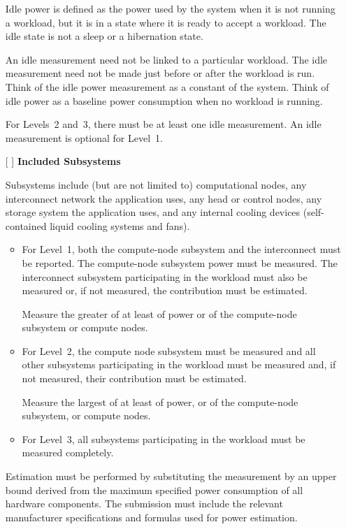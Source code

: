 \begin{itemize}
Idle power is defined as the power used by the system when it is not running a workload, but it is in a state where it is ready to accept a workload.
The idle state is not a sleep or a hibernation state.

An idle measurement need not be linked to a particular workload.
The idle measurement need not be made just before or after the workload is run.
Think of the idle power measurement as a constant of the system.
Think of idle power as a baseline power consumption when no workload is running.

For Levels~2 and~3, there must be at least one idle measurement.
An idle measurement is optional for Level~1.

\newpage
\item[{[ ]}]
\textbf{Included Subsystems}

Subsystems include (but are not limited to) computational nodes, any interconnect network the application uses, any head or control nodes, any storage system the application uses, and any internal cooling devices (self-contained liquid cooling systems and fans).

\begin{itemize}
\item
For Level~1, both the compute-node subsystem and the interconnect must be reported.
The compute-node subsystem power must be measured.
The interconnect subsystem participating in the workload must also be measured or, if not measured, the contribution must be estimated.

Measure the greater of at least \SpecPowerMinLOne{} of power or \SpecFracMinLOne{} of the compute-node subsystem or \SpecMinNodes{} compute nodes.

\item
For Level~2, the compute node subsystem must be measured and all other subsystems participating in the workload must be measured and, if not measured, their contribution must be estimated.

Measure the largest of at least \SpecPowerMinLTwo{} of power, or \SpecFracMinLTwo{} of the compute-node subsystem, or \SpecMinNodes{} compute nodes.

\item
For Level~3, all subsystems participating in the workload must be measured completely.
\end{itemize}

Estimation must be performed by substituting the measurement by an upper bound derived from the maximum specified power consumption of all hardware components.
The submission must include the relevant manufacturer specifications and formulas used for power estimation.


\end{itemize}
